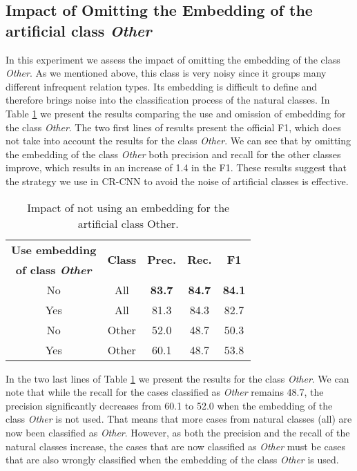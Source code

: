 \documentclass[11pt]{article}
\begin{document}
\subsection{Impact of Omitting the Embedding of the artificial class \emph{Other}}
In this experiment we assess the impact of omitting the embedding of the class \emph{Other}.
As we mentioned above,
this class is very noisy since it groups many different infrequent relation types.
Its embedding is difficult to define and therefore brings noise into the classification process of the natural classes.
In Table \ref{tab:res:classother} we present the results comparing the use and omission of embedding for the class \emph{Other}.
The two first lines of results present the official F1,
which does not take into account the results for the class \emph{Other}.
We can see that by omitting the embedding of the class \emph{Other} both precision and recall for the other classes improve,
which results in an increase of 1.4 in the F1.
These results suggest that the strategy we use in CR-CNN to avoid the noise of artificial classes is effective.

\begin{table}[h!]
\begin{center}
\begin{tabular}{|c|c|ccc|}
\hline  \bf Use embedding & \multirow{2}{*}{\bf Class} & \multirow{2}{*}{\bf Prec.} & \multirow{2}{*}{\bf Rec.} & \multirow{2}{*}{\bf F1} \\ 
     \bf of class \emph{Other} & & & & \\
\hline
No  & All   & \bf 83.7 & \bf 84.7 & \bf 84.1 \\
Yes & All   &  81.3    & 84.3     &  82.7   \\
\hline
No  & Other & 52.0 & 48.7 & 50.3 \\
Yes & Other & 60.1 & 48.7 & 53.8 \\
\hline
\end{tabular}
\end{center}
\caption{\label{tab:res:classother} Impact of not using an embedding for the artificial class Other. }
\end{table}

In the two last lines of Table \ref{tab:res:classother} we present the results for the class \emph{Other}.
We can note that while the recall for the cases classified as \emph{Other} remains 48.7,
the precision significantly decreases from 60.1 to 52.0 when the embedding of the class \emph{Other} is not used.
That means that more cases from natural classes (all) are now been classified as \emph{Other}.
However,
as both the precision and the recall of the natural classes increase,
the cases that are now classified as \emph{Other} must be cases that are also wrongly classified when the embedding of the class \emph{Other} is used.
\end{document}
